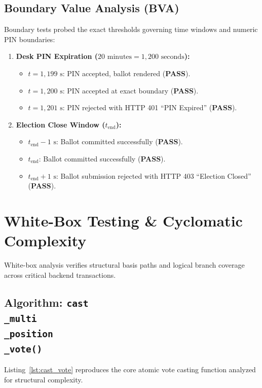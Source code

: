 \documentclass[12pt,a4paper,oneside]{report}
\begin{document}
\subsection{Boundary Value Analysis (BVA)}
Boundary tests probed the exact thresholds governing time windows and numeric PIN boundaries:
\begin{enumerate}
    \item \textbf{Desk PIN Expiration ($20\text{ minutes} = 1,200\text{ seconds}$):}
    \begin{itemize}
        \item $t = 1,199\text{ s}$: PIN accepted, ballot rendered (\textbf{PASS}).
        \item $t = 1,200\text{ s}$: PIN accepted at exact boundary (\textbf{PASS}).
        \item $t = 1,201\text{ s}$: PIN rejected with HTTP 401 ``PIN Expired'' (\textbf{PASS}).
    \end{itemize}
    \item \textbf{Election Close Window ($t_{\text{end}}$):}
    \begin{itemize}
        \item $t_{\text{end}} - 1\text{ s}$: Ballot committed successfully (\textbf{PASS}).
        \item $t_{\text{end}}$: Ballot committed successfully (\textbf{PASS}).
        \item $t_{\text{end}} + 1\text{ s}$: Ballot submission rejected with HTTP 403 ``Election Closed'' (\textbf{PASS}).
    \end{itemize}
\end{enumerate}

\section{White-Box Testing \& Cyclomatic Complexity}
White-box analysis verifies structural basis paths and logical branch coverage across critical backend transactions.

\subsection{Algorithm: \texttt{cast\\_multi\\_position\\_vote()}}
Listing~\ref{lst:cast_vote} reproduces the core atomic vote casting function analyzed for structural complexity.
\end{document}
